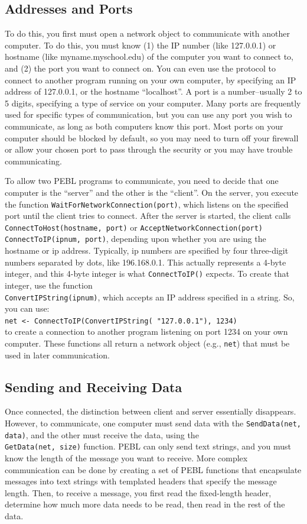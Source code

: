 \subsection{Addresses and Ports}
To do this, you first must open a network object to communicate with
another computer.  To do this, you must know (1) the IP number (like
127.0.0.1) or hostname (like myname.myschool.edu) of the computer you
want to connect to, and (2) the port you want to connect on. You can even
use the protocol to connect to another program running on your own
computer, by specifying an IP address of 127.0.0.1, or the hostname
``localhost''.  A port is
a number--usually 2 to 5 digits, specifying a type of service
on your computer. Many ports are frequently used for specific types of
communication, but you can use any port you wish to communicate, as
long as both computers know this port. Most ports on your computer
should be blocked by default, so you may need to turn off your
firewall or allow your chosen port to pass through the security or you
may have trouble communicating.

To allow two PEBL programs to communicate, you need to decide that one
computer is the ``server'' and the other is the ``client''.  On the
server, you execute the function
\texttt{WaitForNetworkConnection(port)}, which listens on the
specified port until the client tries to connect.  After the server is
started, the client calls \texttt{ConnectToHost(hostname, port)} or
\texttt{AcceptNetworkConnection(port)}
\texttt{ConnectToIP(ipnum, port)}, depending upon whether you are using the
hostname or ip address.  Typically, ip numbers are specified by four
three-digit numbers separated by dots, like 196.168.0.1. This actually
represents a 4-byte integer, and this 4-byte integer is what
\texttt{ConnectToIP()} expects.  To create that integer, use the
function \\ \texttt{ConvertIPString(ipnum)}, which accepts an IP address
specified in a string.  So, you can use:\\
\texttt{net <- ConnectToIP(ConvertIPString( "127.0.0.1"), 1234)}\\
to create a
connection to another program listening on port 1234 on your own
computer.  These functions all return a network object (e.g.,
\texttt{net}) that must be
used in later communication.

\subsection{Sending and Receiving Data}
Once connected, the distinction between client and server essentially
disappears.  However, to communicate, one computer must send data with
the \texttt{SendData(net, data)}, and the other must receive the
data, using the \\\texttt{GetData(net, size)} function.  PEBL can
only send text strings, and you must know the length of the message
you want to receive.  More complex communication can be done by
creating a set of PEBL functions that encapsulate messages into text
strings with templated headers that specify the message length.  Then,
to receive a message, you first read the fixed-length header,
determine how much more data needs to be read, then read in the rest
of the data. 



